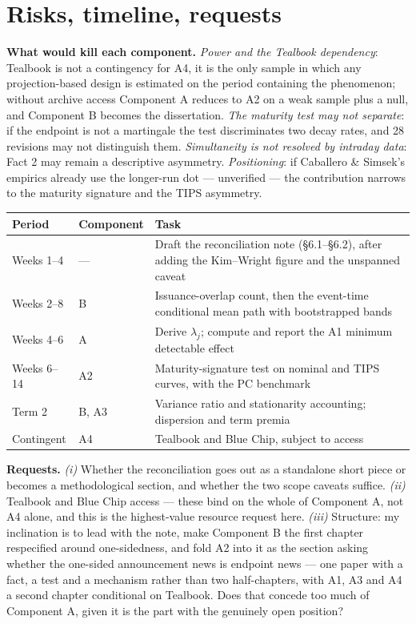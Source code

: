 \documentclass[11pt]{article}
\begin{document}
\section{Risks, timeline, requests}

\textbf{What would kill each component.} \emph{Power and the Tealbook dependency}: Tealbook is not
a contingency for A4, it is the only sample in which any projection-based design is estimated on
the period containing the phenomenon; without archive access Component A reduces to A2 on a weak
sample plus a null, and Component B becomes the dissertation. \emph{The maturity test may not
separate}: if the endpoint is not a martingale the test discriminates two decay rates, and 28
revisions may not distinguish them. \emph{Simultaneity is not resolved by intraday data}: Fact 2
may remain a descriptive asymmetry. \emph{Positioning}: if Caballero \& Simsek's empirics already
use the longer-run dot --- unverified --- the contribution narrows to the maturity signature and
the TIPS asymmetry.

\begin{center}\small
\begin{tabular}{@{}llp{}@{}}
\toprule
\textbf{Period} & \textbf{Component} & \textbf{Task}\\ \midrule
Weeks 1--4 & --- & Draft the reconciliation note (\S6.1--\S6.2), after adding the Kim--Wright figure and the unspanned caveat\\
Weeks 2--8 & B & Issuance-overlap count, then the event-time conditional mean path with bootstrapped bands\\
Weeks 4--6 & A & Derive $\lambda_j$; compute and report the A1 minimum detectable effect\\
Weeks 6--14 & A2 & Maturity-signature test on nominal and TIPS curves, with the PC benchmark\\
Term 2 & B, A3 & Variance ratio and stationarity accounting; dispersion and term premia\\
Contingent & A4 & Tealbook and Blue Chip, subject to access\\
\bottomrule\end{tabular}
\end{center}

\textbf{Requests.} \emph{(i)} Whether the reconciliation goes out as a standalone short piece or
becomes a methodological section, and whether the two scope caveats suffice. \emph{(ii)} Tealbook
and Blue Chip access --- these bind on the whole of Component A, not A4 alone, and this is the
highest-value resource request here. \emph{(iii)} Structure: my inclination is to lead with the
note, make Component B the first chapter respecified around one-sidedness, and fold A2 into it as
the section asking whether the one-sided announcement news is endpoint news --- one paper with a
fact, a test and a mechanism rather than two half-chapters, with A1, A3 and A4 a second chapter
conditional on Tealbook. Does that concede too much of Component A, given it is the part with the
genuinely open position?
\end{document}
